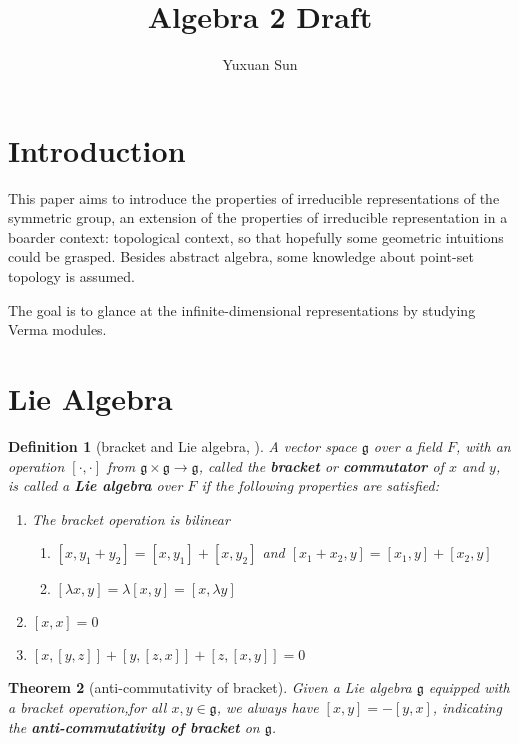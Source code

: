 \documentclass[a4paper]{article}
\title{Algebra 2 Draft}
\author{Yuxuan Sun}
\theoremstyle{bfnote} %
\newtheorem{thm}{Theorem}[section] %
\theoremstyle{bfnote}                  %
\newtheorem{defn}[thm]{Definition}
\theoremstyle{example}                       %
\theoremstyle{remark}                       %
\numberwithin{equation}{section}
\begin{document}
\maketitle

\section{Introduction}
This paper aims to introduce the properties of irreducible representations of the symmetric group, an extension of the properties of irreducible representation in a boarder context: topological context, so that hopefully some geometric intuitions could be grasped. Besides abstract algebra, some knowledge about point-set topology is assumed.

The goal is to glance at the infinite-dimensional representations by studying Verma modules.

\section{Lie Algebra}


\begin{defn}[bracket and Lie algebra, \citep{hall}]\label{bracket}
	A vector space $\mathfrak{g}$ over a field $F$, with an operation $\left[ \cdot, \cdot \right] $ from $\mathfrak{g} \times \mathfrak{g} \to  \mathfrak{g}$, called the  \textbf{bracket} or \textbf{commutator} of $x$ and  $y$, is called a  \textbf{Lie algebra} over $F$ if the following properties are satisfied:
\begin{enumerate}
		 \item The bracket operation is bilinear
\begin{enumerate}
	\item $[x,y_1+y_2] = [x,y_1] + [x,y_2]$ and $[x_1+x_2,y] = [x_1,y] + [x_2,y]$
	\item $[\lambda x, y] = \lambda[x,y] = [x, \lambda y]$
\end{enumerate}
		 \item $[x,x] = 0$
		 \item $[x,[y,z]]+[y,[z,x]] +[z,[x,y]] = 0$
	\end{enumerate}
\end{defn}

\bigskip

\begin{thm}[anti-commutativity of bracket] 
	Given a Lie algebra $\mathfrak{g}$ equipped with a bracket operation,for all  $x,y \in \mathfrak{g}$, we always have $[x,y] = -[y,x]$, indicating the \textbf{anti-commutativity of bracket} on $\mathfrak{g}$. 	
\end{thm}
\end{document}

